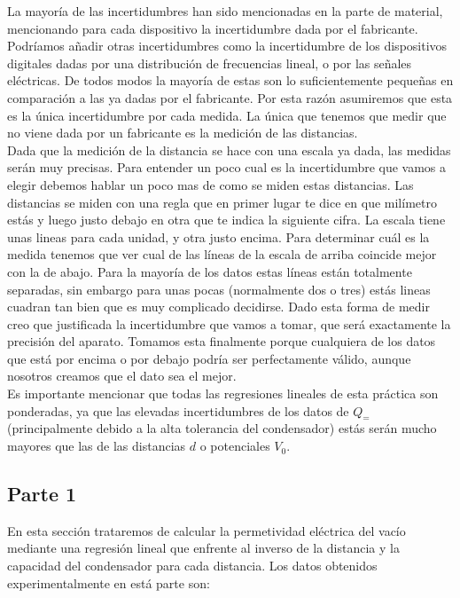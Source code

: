 \documentclass[12pt,a4paper]{article}
\begin{document}
La mayoría de las incertidumbres han sido mencionadas en la parte de material, mencionando para cada dispositivo la incertidumbre dada por el fabricante. Podríamos añadir otras incertidumbres como la incertidumbre de los dispositivos digitales dadas por una distribución de frecuencias lineal, o por las señales eléctricas. De todos modos la mayoría de estas son lo suficientemente pequeñas en comparación a las ya dadas por el fabricante. Por esta razón asumiremos que esta es la única incertidumbre por cada medida. La única que tenemos que medir que no viene dada por un fabricante es la medición de las distancias. \\

Dada que la medición de la distancia se hace con una escala ya dada, las medidas serán muy precisas. Para entender un poco cual es la incertidumbre que vamos a elegir debemos hablar un poco mas de como se miden estas distancias. Las distancias se miden con una regla que en primer lugar te dice en que milímetro estás y luego justo debajo en otra que te indica la siguiente cifra. La escala tiene unas lineas para cada unidad, y otra justo encima. Para determinar cuál es la medida tenemos que ver cual de las líneas de la escala de arriba coincide mejor con la de abajo. Para la mayoría de los datos estas líneas están totalmente separadas, sin embargo para unas pocas (normalmente dos o tres) estás lineas cuadran tan bien que es muy complicado decidirse. Dado esta forma de medir creo que justificada la incertidumbre que vamos a tomar, que será exactamente la precisión del aparato. Tomamos esta finalmente porque cualquiera de los datos que está por encima o por debajo podría ser perfectamente válido, aunque nosotros creamos que el dato sea el mejor.  \\

Es importante mencionar que todas las regresiones lineales de esta práctica son ponderadas, ya que las elevadas incertidumbres de los datos de $Q_=$ (principalmente debido a la alta tolerancia del condensador) estás serán mucho mayores que las de las distancias $d$ o potenciales $V_0$.

\subsection{Parte 1}

En esta sección trataremos de calcular la permetividad eléctrica del vacío mediante una regresión lineal que enfrente al inverso de la distancia y la capacidad del condensador para cada distancia. Los datos obtenidos experimentalmente en está parte son: 
\end{document}
